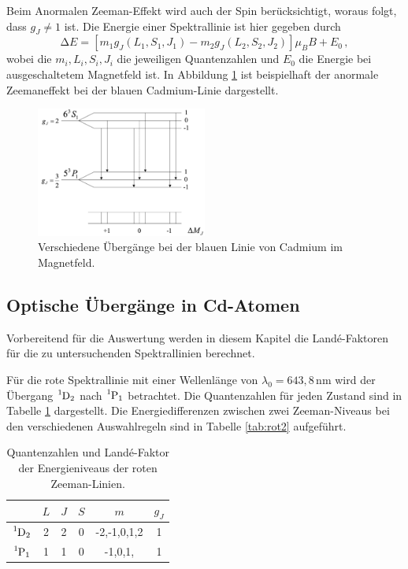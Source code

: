 Beim Anormalen Zeeman-Effekt wird auch der Spin berücksichtigt, woraus folgt, dass
$g_J\neq1$ ist. Die Energie einer Spektrallinie ist hier gegeben durch
\begin{equation}
  \increment E = [m_1 g_J(L_1,S_1,J_1) - m_2 g_J(L_2,S_2,J_2)] \mu_B B +E_0\,,
\end{equation}
wobei die $m_i, L_i, S_i, J_i$ die jeweiligen Quantenzahlen und $E_0$ die Energie bei
ausgeschaltetem Magnetfeld ist. In Abbildung \ref{fig:cdblau} ist beispielhaft der
anormale Zeemaneffekt bei der blauen Cadmium-Linie dargestellt.

\begin{figure}
  \centering
  \includegraphics[width=0.5\textwidth]{data/cd_blau.png}
  \caption{Verschiedene Übergänge bei der blauen Linie von Cadmium im Magnetfeld. \cite{cdblau}}
  \label{fig:cdblau}
\end{figure}


\subsection{Optische Übergänge in Cd-Atomen}
\label{subsec:theorieCadmium}

Vorbereitend für die Auswertung werden in diesem Kapitel die Landé-Faktoren für die
zu untersuchenden Spektrallinien berechnet.

Für die rote Spektrallinie mit einer Wellenlänge von $\lambda_0=643{,}8\,$nm wird
der Übergang $\ce{^{1}D_2}$ nach $\ce{^{1}P_1}$ betrachtet. Die Quantenzahlen für
jeden Zustand sind in Tabelle \ref{tab:rot1} dargestellt. Die Energiedifferenzen zwischen
zwei Zeeman-Niveaus bei den verschiedenen Auswahlregeln sind in Tabelle \ref{tab:rot2}
aufgeführt.

\begin{table}
  \centering
  \caption{Quantenzahlen und Landé-Faktor der Energieniveaus der roten Zeeman-Linien.}
  \begin{tabular}{c c c c c c}
    \toprule
    & $L$ & $J$ & $S$ & $m$ & $g_J$ \\
    \midrule
    $\ce{^{1}D_2}$ & 2 & 2 & 0 & -2,-1,0,1,2 & 1 \\
    $\ce{^{1}P_1}$ & 1 & 1 & 0 & -1,0,1, & 1 \\
    \bottomrule
\end{tabular}
  \label{tab:rot1}
\end{table}

